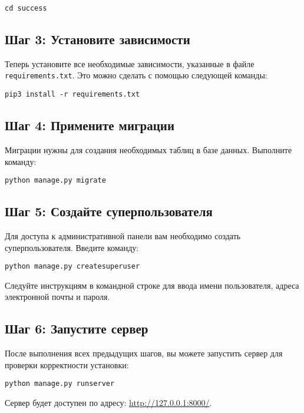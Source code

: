 \documentclass{article}
\begin{document}
    \begin{verbatim}
cd success
    \end{verbatim}

    \subsection{Шаг 3: Установите зависимости}
    Теперь установите все необходимые зависимости, указанные в файле \verb|requirements.txt|. Это можно сделать с помощью следующей команды:

    \begin{verbatim}
pip3 install -r requirements.txt
    \end{verbatim}

    \subsection{Шаг 4: Примените миграции}
    Миграции нужны для создания необходимых таблиц в базе данных. Выполните команду:

    \begin{verbatim}
python manage.py migrate
    \end{verbatim}

    \subsection{Шаг 5: Создайте суперпользователя}
    Для доступа к административной панели вам необходимо создать суперпользователя. Введите команду:

    \begin{verbatim}
python manage.py createsuperuser
    \end{verbatim}

    Следуйте инструкциям в командной строке для ввода имени пользователя, адреса электронной почты и пароля.

    \subsection{Шаг 6: Запустите сервер}
    После выполнения всех предыдущих шагов, вы можете запустить сервер для проверки корректности установки:

    \begin{verbatim}
python manage.py runserver
    \end{verbatim}

    Сервер будет доступен по адресу: \href{http://127.0.0.1:8000/}{http://127.0.0.1:8000/}.
\end{document}
